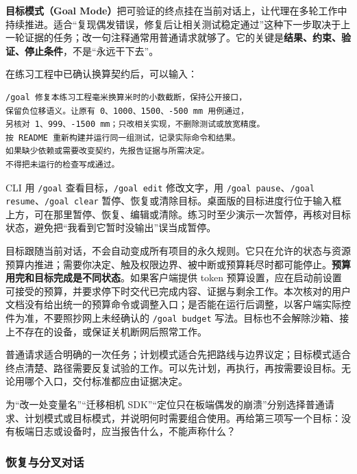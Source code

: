 \textbf{目标模式（Goal Mode）}把可验证的终点挂在当前对话上，让代理在多轮工作中持续推进。适合“复现偶发错误，修复后让相关测试稳定通过”这种下一步取决于上一轮证据的任务；改一句注释通常用普通请求就够了。它的关键是\textbf{结果、约束、验证、停止条件}，不是“永远干下去”。

\begin{example}[给多轮修复设置有边界的目标]
在练习工程中已确认换算契约后，可以输入：
\begin{lstlisting}[language={}]
/goal 修复本练习工程毫米换算米时的小数截断，保持公开接口，
保留负位移语义。让原有 0、1000、1500、-500 mm 用例通过，
另核对 1、999、-1500 mm；只改相关实现，不删除测试或放宽精度。
按 README 重新构建并运行同一组测试，记录实际命令和结果。
如果缺少依赖或需要改变契约，先报告证据与所需决定。
不得把未运行的检查写成通过。
\end{lstlisting}
CLI 用 \texttt{/goal} 查看目标，\texttt{/goal edit} 修改文字，用 \texttt{/goal pause}、\texttt{/goal resume}、\texttt{/goal clear} 暂停、恢复或清除目标。桌面版的目标进度行位于输入框上方，可在那里暂停、恢复、编辑或清除。练习时至少演示一次暂停，再核对目标状态，避免把“我看到它暂时没输出”误当成暂停。
\end{example}

目标跟随当前对话，不会自动变成所有项目的永久规则。它只在允许的状态与资源预算内推进；需要你决定、触及权限边界、被中断或预算耗尽时都可能停止。\textbf{预算用完和目标完成是不同状态}。如果客户端提供 token 预算设置，应在启动前设置可接受的预算，并要求停下时交代已完成内容、证据与剩余工作。本次核对的用户文档没有给出统一的预算命令或调整入口；是否能在运行后调整，以客户端实际控件为准，不要照抄网上未经确认的 \texttt{/goal budget} 写法。目标也不会解除沙箱、接上不存在的设备，或保证关机断网后照常工作。

\begin{conclusion}
普通请求适合明确的一次任务；计划模式适合先把路线与边界议定；目标模式适合终点清楚、路径需要反复试验的工作。可以先计划，再执行，再按需要设目标。无论用哪个入口，交付标准都应由证据决定。
\end{conclusion}

\begin{exercise}\label{ex:ai-workflow-plan-goal}
为“改一处变量名”“迁移相机 SDK”“定位只在板端偶发的崩溃”分别选择普通请求、计划模式或目标模式，并说明何时需要组合使用。再给第三项写一个目标：没有板端日志或设备时，应当报告什么，不能声称什么？
\end{exercise}

\subsubsection{恢复与分叉对话}
\label{sec:ai-dialog-history}

